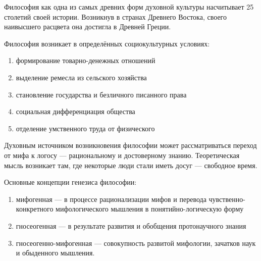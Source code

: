 Философия как одна из самых древних форм духовной культуры насчитывает 25 столетий своей истории. Возникнув в странах Древнего Востока, своего наивысшего расцвета она достигла в Древней Греции.

Философия возникает в определённых социокультурных условиях:
\begin{enumerate}
	\item формирование товарно-денежных отношений
	\item выделение ремесла из сельского хозяйства
	\item становление государства и безличного писанного права
	\item социальная дифференциация общества
	\item отделение умственного труда от физического
\end{enumerate}

Духовным источником возникновения философии может рассматриваться переход от мифа к логосу --- рациональному и достоверному знанию. Теоретическая мысль возникает там, где некоторые люди стали иметь досуг ---  свободное время.

Основные концепции генезиса философии:
\begin{enumerate}
	\item мифогенная --- в процессе рационализации мифов и перевода чувственно-конкретного мифологического мышления в понятийно-логическую форму
	\item гносеогенная --- в результате развития и обобщения протонаучного знания
	\item гносеогенно-мифогенная --- совокупность развитой мифологии, зачатков наук и обыденного мышления.
\end{enumerate}